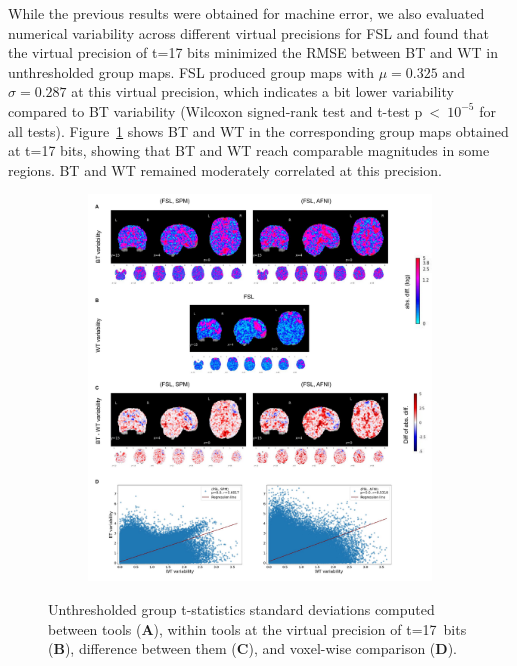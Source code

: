 \documentclass[11pt,onecolumn]{article}
\begin{document}
{While the previous results were obtained for machine error, we also
evaluated numerical variability across different virtual precisions for FSL
and found that the virtual precision of t=17 bits minimized the RMSE
between BT and WT in unthresholded group maps.
FSL produced group maps with $\mu=0.325$ and $\sigma=0.287$ at this virtual precision,
which indicates a bit lower variability compared to BT variability
(Wilcoxon signed-rank test and t-test p~\textless~$10^{-5}$ for all tests).
Figure~\ref{fig:gnp-mni} shows BT
and WT in the corresponding group maps obtained at t=17 bits, showing that
BT and WT reach comparable magnitudes in some regions. BT and WT remained
moderately correlated at this precision.


\begin{figure}[ht]
  \begin{subfigure}[ht]{\textwidth}
    \centering
    \includegraphics[width=.75\textwidth]{figures/bg_global_precision.pdf}
  \end{subfigure}
  \caption{Unthresholded group t-statistics standard deviations computed between tools (\textbf{A}),
    within tools at the virtual precision of t=17~bits (\textbf{B}), difference between them (\textbf{C}), and
    voxel-wise comparison (\textbf{D}).}
  \label{fig:gnp-mni}
\end{figure}


}
\end{document}

